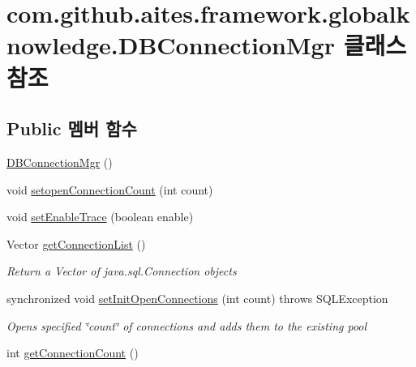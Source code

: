 \hypertarget{classcom_1_1github_1_1aites_1_1framework_1_1globalknowledge_1_1_d_b_connection_mgr}{}\section{com.\+github.\+aites.\+framework.\+globalknowledge.\+D\+B\+Connection\+Mgr 클래스 참조}
\label{classcom_1_1github_1_1aites_1_1framework_1_1globalknowledge_1_1_d_b_connection_mgr}
\subsection*{Public 멤버 함수}
\begin{DoxyCompactItemize}
\item 
\mbox{\hyperlink{classcom_1_1github_1_1aites_1_1framework_1_1globalknowledge_1_1_d_b_connection_mgr_a12d4938d29b3a3f708adf3d34af899bd}{D\+B\+Connection\+Mgr}} ()
\item 
void \mbox{\hyperlink{classcom_1_1github_1_1aites_1_1framework_1_1globalknowledge_1_1_d_b_connection_mgr_aafc8308231c9c60eb1fc54b0179037b4}{setopen\+Connection\+Count}} (int count)
\item 
void \mbox{\hyperlink{classcom_1_1github_1_1aites_1_1framework_1_1globalknowledge_1_1_d_b_connection_mgr_a59f8c631b399c344718aee68adf05994}{set\+Enable\+Trace}} (boolean enable)
\item 
Vector \mbox{\hyperlink{classcom_1_1github_1_1aites_1_1framework_1_1globalknowledge_1_1_d_b_connection_mgr_a29bfa25c4c79961a43a3d3f563cc9575}{get\+Connection\+List}} ()
\begin{DoxyCompactList}\small\item\em Return a Vector of java.\+sql.\+Connection objects \end{DoxyCompactList}\item 
synchronized void \mbox{\hyperlink{classcom_1_1github_1_1aites_1_1framework_1_1globalknowledge_1_1_d_b_connection_mgr_a571b6b625377f7ead62765e532b13763}{set\+Init\+Open\+Connections}} (int count)  throws S\+Q\+L\+Exception
\begin{DoxyCompactList}\small\item\em Opens specified \char`\"{}count\char`\"{} of connections and adds them to the existing pool \end{DoxyCompactList}\item 
int \mbox{\hyperlink{classcom_1_1github_1_1aites_1_1framework_1_1globalknowledge_1_1_d_b_connection_mgr_a7a64007ba60591d2e9554ba0961078eb}{get\+Connection\+Count}} ()

\end{DoxyCompactItemize}
